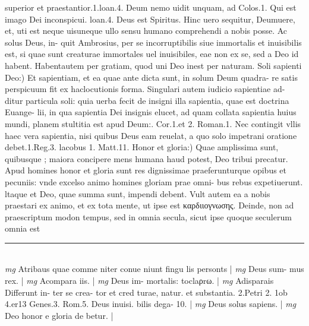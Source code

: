 \documentclass{article}
\begin{document}
\begin{pages}
superior et praestantior.1.loan.4. Deum nemo uidit unquam, ad Colos.1. Qui est imago Dei inconspicui. loan.4. Deus est Spiritus. Hinc uero sequitur, Deumuere, et, uti est neque  uisuneque  ullo sensu humano comprehendi a nobis posse. Ac solus Deus, in- quit Ambrosius, per se incorruptibilis siue immortalis et inuisibilis est, si quae sunt creaturae immortales uel inuisibiles, eae non ex se, sed a Deo id habent. Habentautem per gratiam, quod uni Deo inest per naturam.  \pend\pstart Soli sapienti Deo:) Et sapientiam, et ea quae ante dicta sunt, in solum Deum quadra- re satis perspicuum fit ex haclocutionis forma. Singulari autem iudicio sapientiae ad- ditur particula soli: quia uerba fecit de insigni illa sapientia, quae est doctrina Euange- lii, in qua sapientia Dei insignis elucet, ad quam collata sapientia huius mundi, planem stultitia est apud Deum:. Cor.1.et 2. Roman.1. Nec contingit vllis haec vera sapientia, nisi quibus  Deus eam reuelat, a quo solo impetrani oratione debet.1.Reg.3. lacobus 1. Matt.11. Honor et gloria:) Quae amplissima sunt, quibusque ; maiora concipere mens humana haud potest, Deo tribui precatur. Apud homines honor et gloria sunt res dignissimae praeferunturque  opibus et pecuniis: vnde excelso animo homines gloriam prae omni- bus rebus expetiuerunt. ltaque  et Deo, quae summa sunt, impendi debent. Vult autem ea a nobis praestari ex animo, et ex tota mente, ut ipse est καρδιιογνωσης. Deinde, non ad praescriptum modon tempus, sed in omnia secula, sicut ipse quoque  seculerum omnia est  \pend
\vspace{0.5cm}\noindent
\vspace{0.2cm}\rule{1cm}{0.2pt}\\ 
\hspace{0.2cm}\textit{mg}
\footnotesize Atribaus quae comme niter conue niunt fingu lis personts 
\normalsize| 
\hspace{0.2cm}\textit{mg}
\footnotesize Deus sum- mus rex. 
\normalsize| 
\hspace{0.2cm}\textit{mg}
\footnotesize Acompara iis. 
\normalsize| 
\hspace{0.2cm}\textit{mg}
\footnotesize Deus im- mortalis: toclaρrω. 
\normalsize| 
\hspace{0.2cm}\textit{mg}
\footnotesize Adisparais Differunt in- ter se crea- tor et cred turae, natur. et substantia. 2.Petri 2. 1ob 4.er13 Genes.3. Rom.5. Deus inuisi. bilis dega- 10. 
\normalsize| 
\hspace{0.2cm}\textit{mg}
\footnotesize Deus solus sapiens. 
\normalsize| 
\hspace{0.2cm}\textit{mg}
\footnotesize Deo honor e gloria de betur. 
\normalsize| 

\end{pages}
\end{document}
